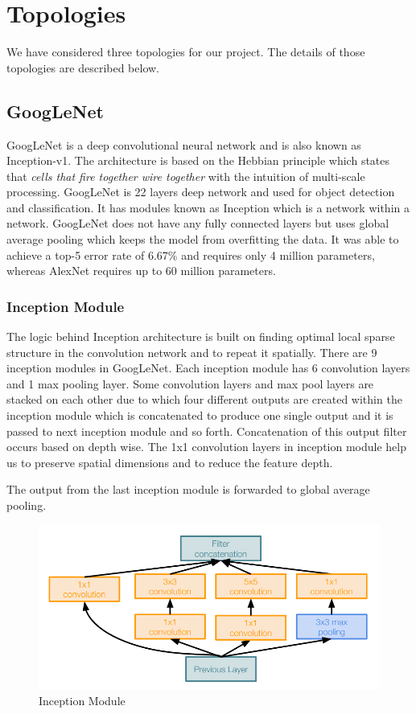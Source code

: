 \documentclass[titlepage]{report}
\begin{document}


\section{Topologies}
We have considered three topologies for our project. The details of those topologies are described below.

\subsection{GoogLeNet}
GoogLeNet is a deep convolutional neural network and is also known as Inception-v1. The architecture is based on the Hebbian principle which states that \textit{cells that fire together wire together} with the intuition of multi-scale processing. GoogLeNet is 22 layers deep network and used for object detection and classification. It has modules known as Inception which is a network within a network. GoogLeNet does not have any fully connected layers but uses global average pooling which keeps the model from overfitting the data. It was able to achieve a top-5 error rate of 6.67\% and requires only 4 million parameters, whereas AlexNet requires up to 60 million parameters.

\subsubsection{Inception Module}
The logic behind Inception architecture is built on finding optimal local sparse structure in the convolution network and to repeat it spatially. There are 9 inception modules in GoogLeNet. Each inception module has 6 convolution layers and 1 max pooling layer. Some convolution layers and max pool layers are stacked on each other due to which four different outputs are created within the inception module which is concatenated to produce one single output and it is passed to next inception module and so forth. Concatenation of this output filter occurs based on depth wise. The 1x1 convolution layers in inception module help us to preserve spatial dimensions and to reduce the feature depth.

The output from the last inception module is forwarded to global average pooling.

\begin{figure}[h!]
    \centering
    \includegraphics[scale=0.4]{googlenet}
    \caption{Inception Module}
\end{figure}
\end{document}

